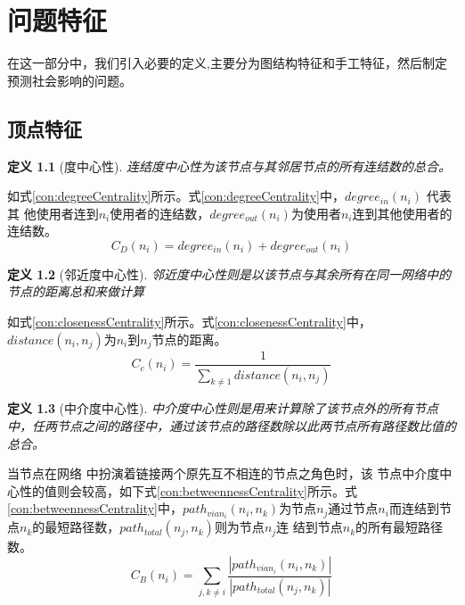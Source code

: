 \newtheorem{theorem}{定义}[section]
\chapter{问题特征}
\label{chap:formulation}
在这一部分中，我们引入必要的定义,主要分为图结构特征和手工特征，然后制定预测社会影响的问题。
\section{顶点特征}
\begin{theorem}[度中心性]
连结度中心性为该节点与其邻居节点的所有连结数的总合。
\end{theorem}
如式\ref{con:degreeCentrality}所示。式\ref{con:degreeCentrality}中，$degree_{in}(n_i)$ 代表其 他使用者连到$n_i$使用者的连结数，$degree_{out}(n_i)$为使用者$n_i$连到其他使用者的连结数。
\begin{equation}
C_D(n_i)=degree_{in}(n_i)+degree_{out}(n_i)
\label{con:degreeCentrality}
\end{equation}




\begin{theorem}[邻近度中心性]
邻近度中心性则是以该节点与其余所有在同一网络中的节点的距离总和来做计算
\end{theorem}
如式\ref{con:closenessCentrality}所示。式\ref{con:closenessCentrality}中，$distance(n_i,n_j)$为$n_i$到$n_j$节点的距离。
\begin{equation}
C_c(n_i)=\frac{1}{\sum_{k\neq1} distance(n_i,n_j)}
\label{con:closenessCentrality}
\end{equation}





\begin{theorem}[中介度中心性]
中介度中心性则是用来计算除了该节点外的所有节点中，任两节点之间的路径中，通过该节点的路径数除以此两节点所有路径数比值的总合。
\end{theorem}
当节点在网络 中扮演着链接两个原先互不相连的节点之角色时，该 节点中介度中心性的值则会较高，如下式\ref{con:betweennessCentrality}所示。式\ref{con:betweennessCentrality}中，$path_{via n_i}(n_i,n_k)$为节点$n_j$通过节点$n_i$而连结到节点$n_k$的最短路径数，$path_{total}(n_j,n_k)$则为节点$n_j$连 结到节点$n_k$的所有最短路径数。
\begin{equation}
C_B(n_i)=\sum_{j,k\neq i}\frac{|path_{via n_i}(n_i,n_k)|}{|path_{total}(n_j,n_k)|}
\label{con:betweennessCentrality}
\end{equation}






